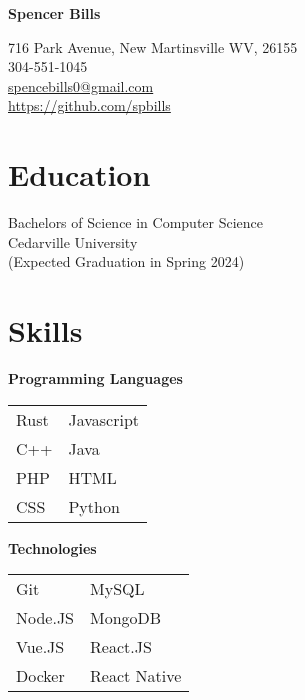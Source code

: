 \documentclass[10pt]{article}
\begin{document}
    \begin{paracol}{2}
        \parbox[top][0.08\textheight][c]{\linewidth}{
            \textbf{\Huge{Spencer Bills}}
        }
        
        \switchcolumn
        
        \parbox[top][0.08\textheight][c]{\linewidth}{
                    716 Park Avenue, New Martinsville WV, 26155 \\
                    304-551-1045 \\
                    \href{mailto://spencebills0@gmail.com}{spencebills0@gmail.com} \\
                    \url{https://github.com/spbills}
        }
        
        \switchcolumn

        \section*{Education}
        \parbox[top][][c]{\linewidth}{
            Bachelors of Science in Computer Science \\
            Cedarville University \\  
            (Expected Graduation in Spring 2024)
        }
        
        \vspace{0.25in}
        
        \section*{Skills}

        \parbox[top][][c]{\linewidth}{
            \begin{center}
                \textbf{Programming Languages}
            \end{center}
            \begin{tabularx}{\linewidth}{YY}
                Rust & Javascript \\
                C++ & Java \\
                PHP & HTML \\
                CSS & Python \\
            \end{tabularx}
            
            \begin{center}
                \textbf{Technologies}
            \end{center}
            \begin{tabularx}{\linewidth}{YY}
                Git & MySQL \\
                Node.JS & MongoDB \\
                Vue.JS & React.JS \\
                Docker & React Native 
            \end{tabularx}
        }


\end{paracol}
\end{document}
